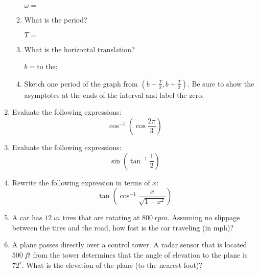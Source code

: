 \documentclass[letterpaper,12pt,fleqn]{article}
\newcommand{\w}{\omega}
\begin{document}
\begin{enumerate}
\begin{enumerate}
    $\w=$

  \item What is the period?

    $T=$
    
  \item What is the horizontal translation?

    $b=$\hspace{1in}to the:
    
  \item Sketch one period of the graph from
    $\left(b-\frac{T}{2},b+\frac{T}{2}\right)$. Be sure to show the asymptotes
    at the ends of the interval and label the zero.

    \vspace{0.25in}

  \end{enumerate}

  \newpage

\item Evaluate the following expressions:
  \[\cos^{-1}\left(\cos\frac{2\pi}{3}\right)\]

  \vspace{2in}

\item Evaluate the following expressions:
  \[\sin\left(\tan^{-1}\frac{1}{2}\right)\]

  \vspace{2in}

\item Rewrite the following expression in terms of $x$:
  \[\tan\left(\cos^{-1}\frac{x}{\sqrt{1-x^2}}\right)\]

  \newpage

\item A car has $\SI{12}{in}$ tires that are rotating at $\SI{800}{rpm}$.
  Assuming no slippage between the tires and the road, how fast is the car
  traveling (in mph)?

  \vspace{4in}

\item A plane passes directly over a control tower. A radar sensor that is
  located $\SI{500}{ft}$ from the tower determines that the angle of
  elevation to the plane is $72^{\circ}$. What is the elevation of the plane
  (to the nearest foot)?

  \newpage


\end{enumerate}
\end{document}
